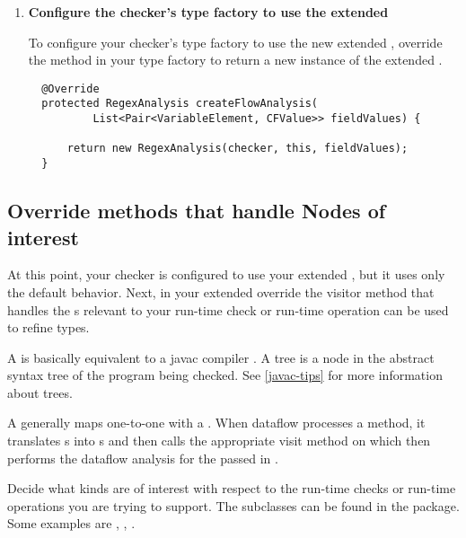 \begin{enumerate}
\item \textbf{Configure the checker's type factory to use the extended
    }

To configure your checker's type factory to use the new extended
, override the
 method in your type factory to return a new instance
of the extended .

\begin{smaller}
\begin{Verbatim}
  @Override
  protected RegexAnalysis createFlowAnalysis(
          List<Pair<VariableElement, CFValue>> fieldValues) {

      return new RegexAnalysis(checker, this, fieldValues);
  }
\end{Verbatim}
\end{smaller}

\end{enumerate}

\subsection{Override methods that handle Nodes of
interest\label{dataflow-override-methods}}

At this point, your checker is configured to use your extended
, but it uses only the default
behavior. Next, in your extended 
override the visitor method that handles the s
relevant to your run-time check or run-time operation can be used to refine
types.

A  is basically equivalent to a javac compiler
.  A tree is a node in the abstract syntax tree of the
program being checked. See \ref{javac-tips} for more information about trees.

A  generally maps one-to-one with a
. When dataflow processes a method, it translates
s into s and then
calls the appropriate visit method on
 which then performs the dataflow
analysis for the passed in .

Decide what  kinds are of interest with
respect to the run-time checks or run-time operations you are trying to support.
The  subclasses can be found in the
 package.  Some examples are
,
,
.

